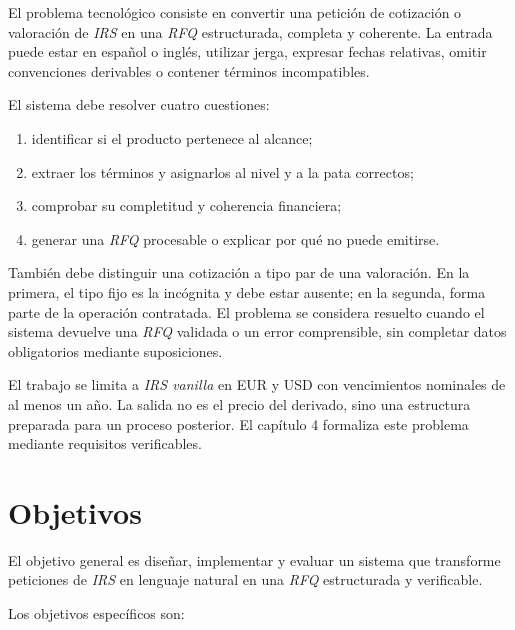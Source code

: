 El problema tecnológico consiste en convertir una petición de cotización o valoración de \textit{IRS} en una \textit{RFQ} estructurada, completa y coherente. La entrada puede estar en español o inglés, utilizar jerga, expresar fechas relativas, omitir convenciones derivables o contener términos incompatibles.

El sistema debe resolver cuatro cuestiones:

\begin{enumerate}
    \item identificar si el producto pertenece al alcance;
    \item extraer los términos y asignarlos al nivel y a la pata correctos;
    \item comprobar su completitud y coherencia financiera;
    \item generar una \textit{RFQ} procesable o explicar por qué no puede emitirse.
\end{enumerate}

También debe distinguir una cotización a tipo par de una valoración. En la primera, el tipo fijo es la incógnita y debe estar ausente; en la segunda, forma parte de la operación contratada. El problema se considera resuelto cuando el sistema devuelve una \textit{RFQ} validada o un error comprensible, sin completar datos obligatorios mediante suposiciones.

El trabajo se limita a \textit{IRS vanilla} en EUR y USD con vencimientos nominales de al menos un año. La salida no es el precio del derivado, sino una estructura preparada para un proceso posterior. El capítulo 4 formaliza este problema mediante requisitos verificables.

\section{Objetivos}
\label{sec:objetivos}

El objetivo general es diseñar, implementar y evaluar un sistema que transforme peticiones de \textit{IRS} en lenguaje natural en una \textit{RFQ} estructurada y verificable.

Los objetivos específicos son:

